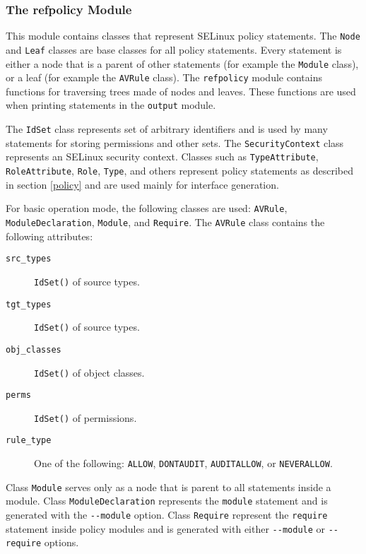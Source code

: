\subsubsection{The refpolicy Module}
This module contains classes that represent SELinux policy statements. The
\texttt{Node} and \texttt{Leaf} classes are base classes for all policy
statements. Every statement is either a node that is a parent of other
statements (for example the \texttt{Module} class), or a leaf (for example the
\texttt{AVRule} class). The \texttt{refpolicy} module contains functions for
traversing trees made of nodes and leaves. These functions are used when
printing statements in the \texttt{output} module.

The \texttt{IdSet} class represents set of arbitrary identifiers and is used by
many statements for storing permissions and other sets. The
\texttt{SecurityContext} class represents an SELinux security context. Classes
such as \texttt{TypeAttribute}, \texttt{RoleAttribute}, \texttt{Role},
\texttt{Type}, and others represent policy statements as described in section
\ref{policy} and are used mainly for interface generation.

For basic operation mode, the following classes are used: \texttt{AVRule},
\texttt{ModuleDeclaration}, \texttt{Module}, and \texttt{Require}. The
\texttt{AVRule} class contains the following attributes:
\begin{description}
    \item [\texttt{src\_types}] \texttt{IdSet()} of source types.
    \item [\texttt{tgt\_types}] \texttt{IdSet()} of source types.
    \item [\texttt{obj\_classes}] \texttt{IdSet()} of object classes.
    \item [\texttt{perms}] \texttt{IdSet()} of permissions.
    \item [\texttt{rule\_type}] One of the following: \texttt{ALLOW},
        \texttt{DONTAUDIT}, \texttt{AUDITALLOW}, or \texttt{NEVERALLOW}.
\end{description}
Class \texttt{Module} serves only as a node that is parent to all statements
inside a module. Class \texttt{ModuleDeclaration} represents the
\texttt{module} statement and is generated with the \texttt{-{}-module} option.
Class \texttt{Require} represent the \texttt{require} statement inside policy
modules and is generated with either \texttt{-{}-module} or \texttt{-{}-require}
options.

